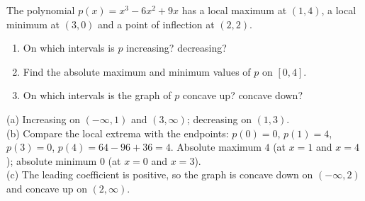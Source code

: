 \begin{exo}{}
The polynomial $p(x)=x^3-6x^2+9x$ has a local maximum at $(1,4)$, a local minimum at $(3,0)$ and a point of inflection at $(2,2)$.
\begin{enumerate}[label=(\alph*)]
\item On which intervals is $p$ increasing? decreasing?
\item Find the absolute maximum and minimum values of $p$ on $[0,4]$.
\item On which intervals is the graph of $p$ concave up? concave down?
\end{enumerate}
\begin{solution}
(a) Increasing on $(-\infty,1)$ and $(3,\infty)$; decreasing on $(1,3)$.\\
(b) Compare the local extrema with the endpoints: $p(0)=0$, $p(1)=4$, $p(3)=0$, $p(4)=64-96+36=4$. Absolute maximum $4$ (at $x=1$ and $x=4$); absolute minimum $0$ (at $x=0$ and $x=3$).\\
(c) The leading coefficient is positive, so the graph is concave down on $(-\infty,2)$ and concave up on $(2,\infty)$.
\end{solution}
\end{exo}

